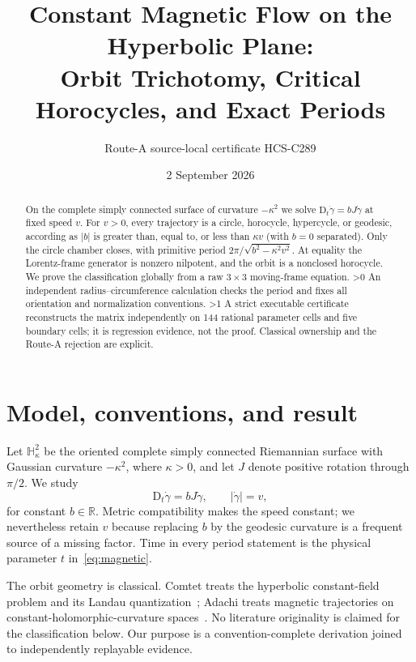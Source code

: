 \documentclass[10pt]{article}
\title{Constant Magnetic Flow on the Hyperbolic Plane:\\Orbit Trichotomy, Critical Horocycles, and Exact Periods}
\author{Route-A source-local certificate HCS-C289}
\date{2 September 2026}
\providecommand{\CRevisionRound}{2}
\newcommand{\Hh}{\mathbb H^2_\kappa}
\newcommand{\R}{\mathbb R}
\newcommand{\D}{\mathrm D}
\begin{document}
\maketitle

\begin{abstract}
On the complete simply connected surface of curvature $-\kappa^2$ we solve
$\D_t\dot\gamma=bJ\dot\gamma$ at fixed speed $v$.
For $v>0$, every trajectory is a circle, horocycle, hypercycle, or geodesic,
according as $|b|$ is greater than, equal to, or less than $\kappa v$ (with
$b=0$ separated).  Only the circle chamber closes, with primitive period
$2\pi/\sqrt{b^2-\kappa^2v^2}$.  At equality the Lorentz-frame generator is
nonzero nilpotent, and the orbit is a nonclosed horocycle.  We prove the
classification globally from a raw $3\times3$ moving-frame equation.
\ifnum\CRevisionRound>0
An independent radius--circumference calculation checks the period and fixes
all orientation and normalization conventions.
\fi
\ifnum\CRevisionRound>1
A strict executable certificate reconstructs the matrix independently on 144
rational parameter cells and five boundary cells; it is regression evidence,
not the proof.  Classical ownership and the Route-A rejection are explicit.
\fi
\end{abstract}

\section{Model, conventions, and result}
Let $\Hh$ be the oriented complete simply connected Riemannian surface with
Gaussian curvature $-\kappa^2$, where $\kappa>0$, and let $J$ denote positive
rotation through $\pi/2$.  We study
\begin{equation}\label{eq:magnetic}
 \D_t\dot\gamma=bJ\dot\gamma,\qquad |\dot\gamma|=v,
\end{equation}
for constant $b\in\R$.  Metric compatibility makes the speed constant; we
nevertheless retain $v$ because replacing $b$ by the geodesic curvature is a
frequent source of a missing factor.  Time in every period statement is the
physical parameter $t$ in~\eqref{eq:magnetic}.

The orbit geometry is classical.  Comtet treats the hyperbolic constant-field
problem and its Landau quantization~\cite{Comtet1987}; Adachi treats magnetic
trajectories on constant-holomorphic-curvature spaces~\cite{Adachi1995}.  No
literature originality is claimed for the classification below.  Our purpose
is a convention-complete derivation joined to independently replayable
evidence.
\end{document}
